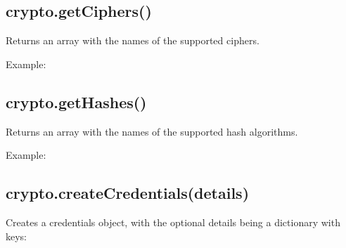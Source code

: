 \subsection{crypto.getCiphers()}\label{crypto.getciphers}

Returns an array with the names of the supported ciphers.

Example:

\begin{Shaded}
\begin{Highlighting}[]
 \NormalTok{();}
\end{Highlighting}
\end{Shaded}

\subsection{crypto.getHashes()}\label{crypto.gethashes}

Returns an array with the names of the supported hash algorithms.

Example:

\begin{Shaded}
\begin{Highlighting}[]
 \NormalTok{();}
\end{Highlighting}
\end{Shaded}

\subsection{crypto.createCredentials(details)}\label{crypto.createcredentialsdetails}

Creates a credentials object, with the optional details being a
dictionary with keys:

